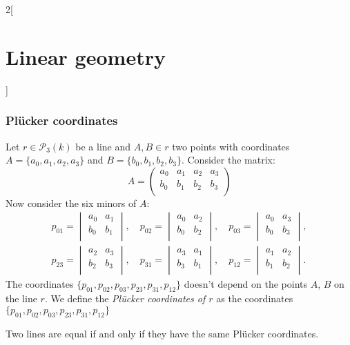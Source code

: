 \documentclass[../../../main.tex]{subfiles}
\begin{document}
\begin{multicols}{2}[\section{Linear geometry}]
\subsubsection*{Plücker coordinates}
\begin{prop}
Let $r\in\mathcal{P}_3(k)$ be a line and $A,B\in r$ two points with coordinates $A=\{a_0,a_1,a_2,a_3\}$ and $B=\{b_0,b_1,b_2,b_3\}$. Consider the matrix: $$A=\begin{pmatrix}
a_0 & a_1 & a_2 & a_3 \\
b_0 & b_1 & b_2 & b_3 \\
\end{pmatrix}$$ Now consider the six minors of $A$:
\begin{gather*}
    p_{01}=\begin{vmatrix}
a_0 & a_1 \\
b_0 & b_1 \\
\end{vmatrix},\quad p_{02}=\begin{vmatrix}
a_0 & a_2 \\
b_0 & b_2 \\
\end{vmatrix},\quad p_{03}=\begin{vmatrix}
a_0 & a_3 \\
b_0 & b_3 \\
\end{vmatrix},\\ p_{23}=\begin{vmatrix}
a_2 & a_3 \\
b_2 & b_3 \\
\end{vmatrix},\quad p_{31}=\begin{vmatrix}
a_3 & a_1 \\
b_3 & b_1 \\
\end{vmatrix},\quad p_{12}=\begin{vmatrix}
a_1 & a_2 \\
b_1 & b_2 \\
\end{vmatrix}.
\end{gather*}
The coordinates $\{p_{01},p_{02},p_{03},p_{23},p_{31},p_{12}\}$ doesn't depend on the points $A$, $B$ on the line $r$. We define the \textit{Plücker coordinates of $r$} as the coordinates $\{p_{01},p_{02},p_{03},p_{23},p_{31},p_{12}\}$ 
\end{prop}
\begin{prop}
Two lines are equal if and only if they have the same Plücker coordinates.

\end{prop}
\end{multicols}
\end{document}
